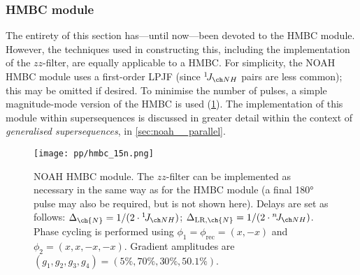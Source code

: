 \subsubsection{\nitrogen{} HMBC module}

The entirety of this section has---until now---been devoted to the \carbon{} HMBC module.
However, the techniques used in constructing this, including the implementation of the $zz$-filter, are equally applicable to a \nitrogen{} HMBC.
For simplicity, the NOAH \nitrogen{} HMBC module uses a first-order LPJF (since $\oneJ{NH}$ pairs are less common); this may be omitted if desired.
To minimise the number of pulses, a simple magnitude-mode version of the HMBC is used (\cref{fig:noah_15n_hmbc}).
The implementation of this module within supersequences is discussed in greater detail within the context of \textit{generalised supersequences}, in \cref{sec:noah__parallel}.

\begin{figure}[htb]
    \centering
    \texttt{[image: pp/hmbc\_15n.png]}%
    \caption[NOAH \nitrogen{} HMBC module]{
        NOAH \nitrogen{} HMBC module.
        The $zz$-filter can be implemented as necessary in the same way as for the \carbon{} HMBC module (a final \proton{} \ang{180} pulse may also be required, but is not shown here).
        Delays are set as follows: $\Delta_{\ch{N}} = 1 / (2 \cdot \oneJ{NH})$; $\Delta_{\text{LR},\ch{N}} = 1 / (2 \cdot \nJ{NH})$.
        Phase cycling is performed using $\phi_1 = \phi_\text{rec} = (x, -x)$ and $\phi_2 = (x, x, -x, -x)$.
        Gradient amplitudes are $(g_1, g_2, g_3, g_4) = (5\%, 70\%, 30\%, 50.1\%)$.
    }
    \label{fig:noah_15n_hmbc}
\end{figure}
